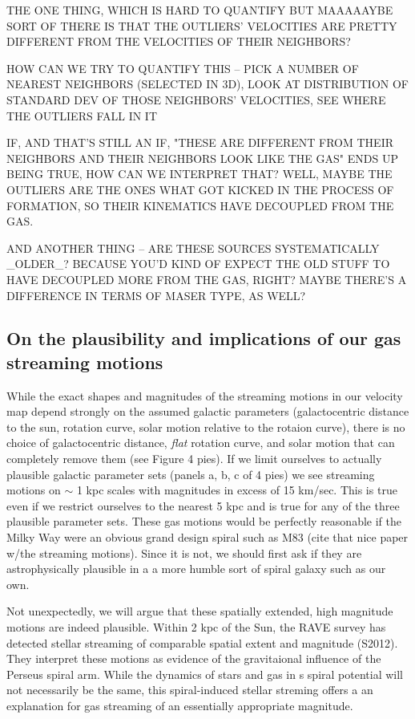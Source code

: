 THE ONE THING, WHICH IS HARD TO QUANTIFY BUT MAAAAAYBE SORT OF THERE IS THAT THE OUTLIERS' VELOCITIES ARE PRETTY DIFFERENT FROM THE VELOCITIES OF THEIR NEIGHBORS? 

HOW CAN WE TRY TO QUANTIFY THIS -- PICK A NUMBER OF NEAREST NEIGHBORS (SELECTED IN 3D), LOOK AT DISTRIBUTION OF STANDARD DEV OF THOSE NEIGHBORS' VELOCITIES, SEE WHERE THE OUTLIERS FALL IN IT

IF, AND THAT'S STILL AN IF, "THESE ARE DIFFERENT FROM THEIR NEIGHBORS AND THEIR NEIGHBORS LOOK LIKE THE GAS" ENDS UP BEING TRUE, HOW CAN WE INTERPRET THAT? WELL, MAYBE THE OUTLIERS ARE THE ONES WHAT GOT KICKED IN THE PROCESS OF FORMATION, SO THEIR KINEMATICS HAVE DECOUPLED FROM THE GAS.

AND ANOTHER THING -- ARE THESE SOURCES SYSTEMATICALLY _OLDER_? BECAUSE YOU'D KIND OF EXPECT THE OLD STUFF TO HAVE DECOUPLED MORE FROM THE GAS, RIGHT? MAYBE THERE'S A DIFFERENCE IN TERMS OF MASER TYPE, AS WELL?

\subsection{On the plausibility and implications of our gas streaming motions}
While the exact shapes and magnitudes of the streaming motions in our velocity map depend strongly on the assumed galactic parameters (galactocentric distance to the sun, rotation curve, solar motion relative to the rotaion curve), there is no choice of galactocentric distance, \emph{flat} rotation curve, and solar motion that can completely remove them (see Figure 4 pies).
If we limit ourselves to actually plausible galactic parameter sets (panels a, b, c of 4 pies) we see streaming motions on $\sim$ 1 kpc scales with magnitudes in excess of 15 km/sec. 
This is true even if we restrict ourselves to the nearest 5 kpc and is true for any of the three plausible parameter sets. 
These gas motions would be perfectly reasonable if the Milky Way were an obvious grand design spiral such as M83 (cite that nice paper w/the streaming motions). 
Since it is not, we should first ask if they are astrophysically plausible in a a more humble sort of spiral galaxy such as our own. 

Not unexpectedly, we will argue that these spatially extended, high magnitude motions are indeed plausible.
Within 2 kpc of the Sun, the RAVE survey has detected stellar streaming of comparable spatial extent and magnitude (S2012). They interpret these motions as evidence of the gravitaional influence of the Perseus spiral arm.
While the dynamics of stars and gas in s spiral potential will not necessarily be the same, this spiral-induced stellar streming offers a an explanation for gas streaming of an essentially appropriate magnitude.

